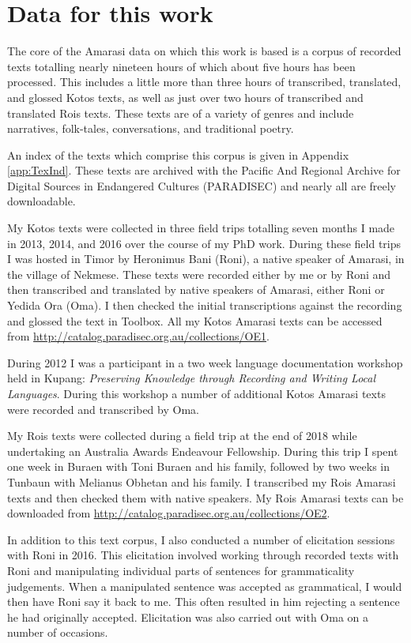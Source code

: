 \section{Data for this work}\label{sec:Meth}
The core of the Amarasi data on which this work is based
is a corpus of recorded texts totalling nearly nineteen hours
of which about five hours has been processed.
This includes a little more than three hours of
transcribed, translated, and glossed Kotos texts,
as well as just over two hours of transcribed and translated Ro{\Q}is texts.
These texts are of a variety of genres and include narratives, folk-tales,
conversations, and traditional poetry.

An index of the texts which comprise this corpus is given in Appendix \ref{app:TexInd}.
These texts are archived with the
Pacific And Regional Archive for Digital Sources in Endangered Cultures (PARADISEC)
and nearly all are freely downloadable.

My Kotos texts were collected in three
field trips totalling seven months I made
in 2013, 2014, and 2016 over the course of my PhD work.
During these field trips I was hosted in Timor by
Heronimus Bani (Roni), a native speaker of Amarasi, in the village of Nekmese{\Q}.
These texts were recorded either by me or by Roni
and then transcribed and translated by native speakers of Amarasi, either Roni or Yedida Ora (Oma).
I then checked the initial transcriptions against the recording and glossed the text in Toolbox.
All my Kotos Amarasi texts can be accessed
from \url{http://catalog.paradisec.org.au/collections/OE1}.

During 2012 I was a participant in a two week
language documentation workshop held in Kupang:
\emph{Preserving Knowledge through Recording and Writing Local Languages}.
During this workshop a number of additional Kotos Amarasi
texts were recorded and transcribed by Oma.

My Ro{\Q}is texts were collected during a
field trip at the end of 2018
while undertaking an Australia Awards Endeavour Fellowship.
During this trip I spent one week in Buraen
with Toni Buraen and his family, followed by
two weeks in Tunbaun with Melianus Obhetan and his family.
I transcribed my Ro{\Q}is Amarasi texts
and then checked them with native speakers.
My Ro{\Q}is Amarasi texts can be downloaded from
\url{http://catalog.paradisec.org.au/collections/OE2}.

In addition to this text corpus, I also conducted a number of
elicitation sessions with Roni in 2016.
This elicitation involved working through recorded texts with Roni
and manipulating individual parts of sentences for grammaticality judgements.
When a manipulated sentence was accepted as grammatical,
I would then have Roni say it back to me.
This often resulted in him rejecting a sentence he had originally accepted.
Elicitation was also carried out with Oma on a number of occasions.

